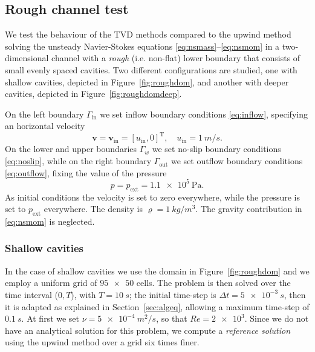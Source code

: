 \subsection{Rough channel test} \label{subsec:roughchannel}
We test the behaviour of the TVD methods compared to the upwind method solving 
the unsteady Navier-Stokes equations \eqref{eq:nsmass}--\eqref{eq:nsmom} in 
a two-dimensional channel with a \emph{rough} (i.e. non-flat) lower boundary that 
consists of small evenly spaced cavities. Two different 
configurations are studied, one with shallow cavities, depicted in 
Figure~\ref{fig:roughdom}, and another with deeper cavities, depicted in 
Figure~\ref{fig:roughdomdeep}.

On the left boundary $\Gamma_\text{in}$ we set inflow boundary conditions 
\eqref{eq:inflow}, specifying an horizontal velocity
\begin{equation}
	\mathbf{v} = \mathbf{v}_\text{in} = [u_\text{in}, 0]^\mathrm{T}, \quad 
	u_\text{in} = \SI{1}{m/s}.
\end{equation}
On the lower and upper boundaries $\Gamma_w$ we set no-slip boundary conditions 
\eqref{eq:noslip}, while on the right boundary $\Gamma_\text{out}$ we set 
outflow boundary conditions \eqref{eq:outflow}, fixing the value of the pressure
\begin{equation}
	p = p_\text{ext} = \SI{1.1e5}{\pascal}.
\end{equation}
As initial conditions the velocity is set to zero everywhere, while the 
pressure is set to $p_\text{ext}$ everywhere. The density is 
$\varrho=\SI{1}{kg/m^3}$. The gravity contribution in \eqref{eq:nsmom} is 
neglected.
%
\subsubsection{Shallow cavities}
In the case of shallow cavities we use the domain in Figure~\ref{fig:roughdom} 
and we employ a uniform grid of $\num{95x50}$ cells. The problem is then solved 
over the time interval ($0,T$), with $T=\SI{10}{s}$; the initial time-step is 
$\Delta t=\SI{5e-3}{s}$, then it is adapted as explained in 
Section~\ref{sec:algeq}, allowing a maximum time-step of $\SI{0.1}{s}$. 
At first we set $\nu=\SI{5e-4}{m^2/s}$, so that $Re=\num{2e3}$. Since we do not 
have an analytical solution for this problem, we compute a \emph{reference 
solution} using the upwind method over a grid six times finer.

